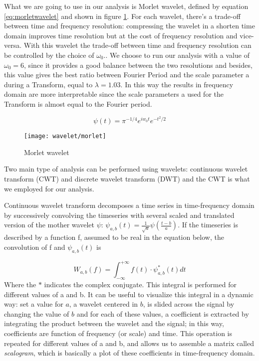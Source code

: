 \documentclass[11pt]{report}
\begin{document}
What we are going to use in our analysis is Morlet wavelet, defined by equation \ref{eq:morletwavelet} and shown in figure \ref{fig:wavelet_morlet}.
For each wavelet, there's a trade-off between time and frequency resolution: compressing the wavelet in a shorten time domain improves time resolution but at the cost of frequency resolution and vice-versa.
With this wavelet the trade-off between time and frequency resolution can be controlled by the choice of $\omega_0$.\cite{muller-2004}.
We choose to run our analysis with a value of $\omega_0 = 6$, since it provides a good balance between the two resolutions \cite{grinsted-2004} and besides, this value gives the best ratio between Fourier Period and the scale parameter a during a Transform, equal to $\lambda = 1.03$.
In this way the results in frequency domain are more interpretable since the scale parameters a used for the Transform is almost equal to the Fourier period.


\begin{equation}\label{eq:morletwavelet}
\psi\left(t\right) = \pi^{-1/4}e^{iw_0 t}e^{-t^2/2}
\end{equation}

\begin{figure}[h]
\centering
\texttt{[image: wavelet/morlet]}
\caption{Morlet wavelet}
\label{fig:wavelet_morlet}
\end{figure}

Two main type of analysis can be performed using wavelets: continuous wavelet transform (CWT) and discrete wavelet transform (DWT) and the CWT is what we employed for our analysis.

Continuous wavelet transform decomposes a time series in time-frequency domain by successively convolving the timeseries with several scaled and translated version of the mother wavelet $\psi$: $\psi_{a, b}\left(t\right) = \frac{1}{\sqrt{a}}\psi(\frac{t-b}{a})$.
If the timeseries is described by a function f, assumed to be real in the equation below, the convolution of f and $\psi_{a, b}\left(t\right)$ is

\begin{equation}
W_{a,b}(f) = \int_{-\infty}^{+\infty}  f(t) \cdot \psi_{a, b}^\ast \left(t\right)   dt
\end{equation}
Where the $\ast$ indicates the complex conjugate.
This integral is performed for different values of a and b.
It can be useful to visualize this integral in a dynamic way: set a value for $a$, a wavelet centered in $b$, is slided across the signal by changing the value of $b$ and for each of these values, a coefficient is extracted by integrating the product between the wavelet and the signal; in this way, coefficients are function of frequency (or scale) and time. This operation is repeated for different values of a and b, and allows us to assemble a matrix called \emph{scalogram}, which is basically a plot of these coefficients in time-frequency domain.
\end{document}
